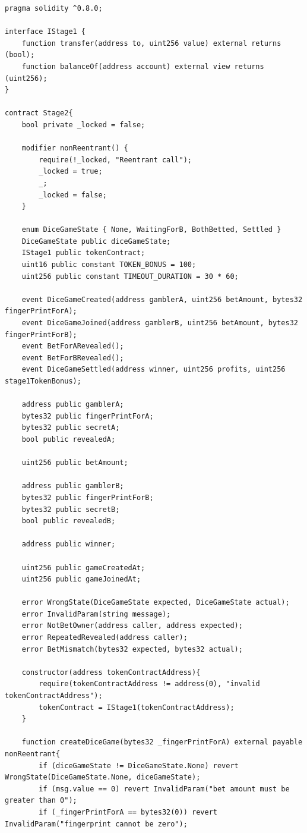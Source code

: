 \documentclass[10pt,a4paper]{article}
\begin{document}
\begin{lstlisting}
pragma solidity ^0.8.0;

interface IStage1 {
    function transfer(address to, uint256 value) external returns (bool);
    function balanceOf(address account) external view returns (uint256);
}

contract Stage2{
    bool private _locked = false;
    
    modifier nonReentrant() {
        require(!_locked, "Reentrant call");
        _locked = true;
        _;
        _locked = false;
    }
    
    enum DiceGameState { None, WaitingForB, BothBetted, Settled }
    DiceGameState public diceGameState;
    IStage1 public tokenContract;
    uint16 public constant TOKEN_BONUS = 100; 
    uint256 public constant TIMEOUT_DURATION = 30 * 60;

    event DiceGameCreated(address gamblerA, uint256 betAmount, bytes32 fingerPrintForA);
    event DiceGameJoined(address gamblerB, uint256 betAmount, bytes32 fingerPrintForB);
    event BetForARevealed();
    event BetForBRevealed();
    event DiceGameSettled(address winner, uint256 profits, uint256 stage1TokenBonus);

    address public gamblerA;
    bytes32 public fingerPrintForA;
    bytes32 public secretA;
    bool public revealedA;

    uint256 public betAmount;

    address public gamblerB;
    bytes32 public fingerPrintForB;
    bytes32 public secretB;
    bool public revealedB;

    address public winner;
    
    uint256 public gameCreatedAt;
    uint256 public gameJoinedAt;

    error WrongState(DiceGameState expected, DiceGameState actual);
    error InvalidParam(string message);
    error NotBetOwner(address caller, address expected);
    error RepeatedRevealed(address caller);
    error BetMismatch(bytes32 expected, bytes32 actual);

    constructor(address tokenContractAddress){
        require(tokenContractAddress != address(0), "invalid tokenContractAddress");
        tokenContract = IStage1(tokenContractAddress);
    }

    function createDiceGame(bytes32 _fingerPrintForA) external payable nonReentrant{
        if (diceGameState != DiceGameState.None) revert WrongState(DiceGameState.None, diceGameState);
        if (msg.value == 0) revert InvalidParam("bet amount must be greater than 0");
        if (_fingerPrintForA == bytes32(0)) revert InvalidParam("fingerprint cannot be zero");


\end{lstlisting}
\end{document}
